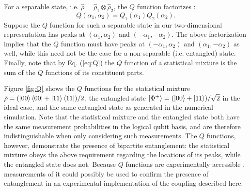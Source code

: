For a separable state, i.e. $\hat{\rho} = \hat{\rho}_1 \otimes \hat{\rho}_2$, the $Q$ function factorizes \cite{floerchinger_2022}:
\[
    Q(\alpha_1, \alpha_2) = Q_1(\alpha_1) Q_2(\alpha_2).
\]
Suppose the $Q$ function for such a separable state in our two-dimensional representation has peaks at $(\alpha_1, \alpha_2)$ and $(-\alpha_1, -\alpha_2)$.
The above factorization implies that the $Q$ function must have peaks at $(-\alpha_1, \alpha_2)$ and $(\alpha_1, -\alpha_2)$ as well, while this need not be the case for a non-separable (i.e. entangled) state.
Finally, note that by Eq. (\ref{eq:Q}) the $Q$ function of a statistical mixture is the sum of the $Q$ functions of its constituent parts.

Figure \ref{fig:Q} shows the $Q$ functions for the statistical mixture $\hat{\rho} = (\ket{00}\bra{00} + \ket{11}\bra{11}) / 2$, the entangled state $\ket{\Phi^+} = (\ket{00} + \ket{11}) / \sqrt{2}$ in the ideal case, and the same entangled state as generated in the numerical simulation.
Note that the statistical mixture and the entangled state both have the same measurement probabilities in the logical qubit basis, and are therefore indistinguishable when only considering such measurements.
The $Q$ functions, however, demonstrate the presence of bipartite entanglement: the statistical mixture obeys the above requirement regarding the locations of its peaks, while the entangled state does not.
Because $Q$ functions are experimentally accessible \cite{kirchmair_2013,floerchinger_2022}, measurements of it could possibly be used to confirm the presence of entanglement in an experimental implementation of the coupling described here.

